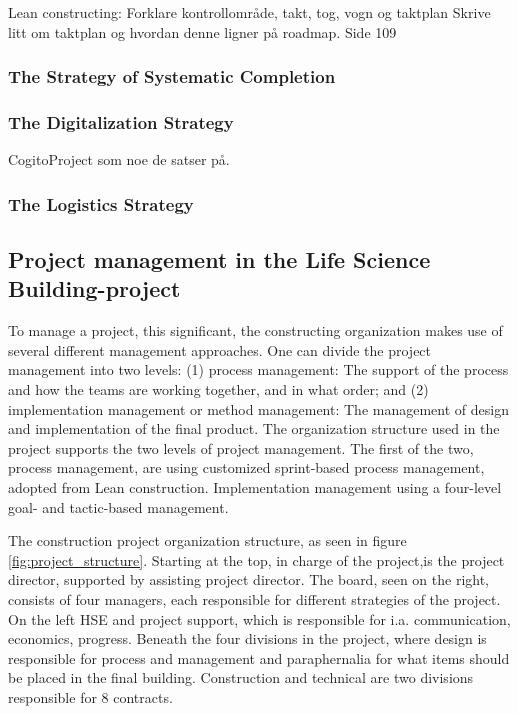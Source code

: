 Lean constructing: Forklare kontrollområde, takt, tog, vogn og taktplan
Skrive litt om taktplan og hvordan denne ligner på roadmap. Side 109




\subsubsection*{The Strategy of Systematic Completion}
\subsubsection*{The Digitalization Strategy}
CogitoProject som noe de satser på. 
\subsubsection*{The Logistics Strategy}


\subsection*{Project management in the Life Science Building-project}
To manage a project, this significant, the constructing organization makes use of several different management approaches. One can divide the project management into two levels: (1) process management: The support of the process and how the teams are working together, and in what order; and (2) implementation management or method management: The management of design and implementation of the final product. The organization structure used in the project supports the two levels of project management. The first of the two, process management, are using customized sprint-based process management, adopted from Lean construction. Implementation management using a four-level goal- and tactic-based management.  

The construction project organization structure, as seen in figure \ref{fig:project_structure}. Starting at the top, in charge of the project,is the project director, supported by assisting project director. The board, seen on the right, consists of four managers, each responsible for different strategies of the project. On the left HSE and project support, which is responsible for i.a. communication, economics, progress. Beneath the four divisions in the project, where design is responsible for process and management and paraphernalia for what items should be placed in the final building. Construction and technical are two divisions responsible for 8 contracts.

